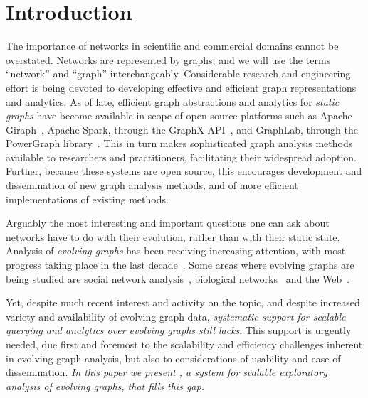 \section{Introduction}
\label{sec:intro}

The importance of networks in scientific and commercial domains cannot
be overstated.  Networks are represented by graphs, and we will use
the terms ``network'' and ``graph'' interchangeably.  Considerable
research and engineering effort is being devoted to developing
effective and efficient graph representations and analytics.  As of
late, efficient graph abstractions and analytics for {\em static
  graphs} have become available in scope of open source platforms such
as Apache Giraph~\cite{ApacheGiraph}, Apache Spark, through the GraphX
API~\cite{DBLP:conf/osdi/GonzalezXDCFS14}, and GraphLab, through the
PowerGraph library~\cite{DBLP:conf/osdi/GonzalezLGBG12}.  This in turn
makes sophisticated graph analysis methods available to researchers
and practitioners, facilitating their widespread adoption.  Further,
because these systems are open source, this encourages development and
dissemination of new graph analysis methods, and of more efficient
implementations of existing methods.

Arguably the most interesting and important questions one can ask
about networks have to do with their evolution, rather than with their
static state.  Analysis of {\em evolving graphs} has been receiving
increasing attention, with most progress taking place in the last
decade~\cite{DBLP:journals/csur/AggarwalS14,Chan2008,Kan2009,DBLP:journals/tos/MiaoHLWYZPCC15,Ren2011,Semertzidis2015}.
Some areas where evolving graphs are being studied are social network
analysis~\cite{DBLP:conf/icwsm/GoetzLMF09,DBLP:journals/tweb/LeskovecAH07,DBLP:conf/kdd/LeskovecBKT08,DBLP:conf/icml/SarkarCJ12},
biological networks~\cite{DBLP:journals/tkdd/AsurPU09,DBLP:journals/tcsb/BeyerTLSF10,Stuart2003} and the Web~\cite{DBLP:journals/kais/ChanBL08,DBLP:journals/jisa/PapadimitriouDG10}.

Yet, despite much recent interest and activity on the topic, and
despite increased variety and availability of evolving graph data,
{\em systematic support for scalable querying and analytics over
  evolving graphs still lacks}.  This support is urgently needed, due
first and foremost to the scalability and efficiency challenges
inherent in evolving graph analysis, but also to considerations of
usability and ease of dissemination.  {\em In this paper we present
  \ql, a system for scalable exploratory analysis of evolving graphs,
  that fills this gap.}

